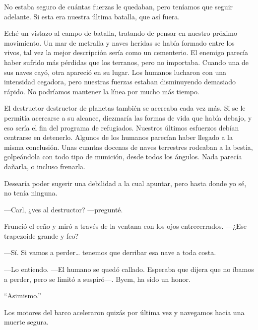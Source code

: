 No estaba seguro de cuántas fuerzas le quedaban, pero teníamos que seguir adelante. Si esta era nuestra última batalla, que así fuera.

Eché un vistazo al campo de batalla, tratando de pensar en nuestro próximo movimiento. Un mar de metralla y naves heridas se había formado entre los vivos, tal vez la mejor descripción sería como un cementerio. El enemigo parecía haber sufrido más pérdidas que los terranos, pero no importaba. Cuando una de sus naves cayó, otra apareció en su lugar. Los humanos lucharon con una intensidad cegadora, pero nuestras fuerzas estaban disminuyendo demasiado rápido. No podríamos mantener la línea por mucho más tiempo.

El destructor destructor de planetas también se acercaba cada vez más. Si se le permitía acercarse a su alcance, diezmaría las formas de vida que había debajo, y eso sería el fin del programa de refugiados. Nuestros últimos esfuerzos debían centrarse en detenerlo. Algunos de los humanos parecían haber llegado a la misma conclusión. Unas cuantas docenas de naves terrestres rodeaban a la bestia, golpeándola con todo tipo de munición, desde todos los ángulos. Nada parecía dañarla, o incluso frenarla.

Desearía poder sugerir una debilidad a la cual apuntar, pero hasta donde yo sé, no tenía ninguna.

—Carl, ¿ves al destructor? —pregunté.

Frunció el ceño y miró a través de la ventana con los ojos entrecerrados. —¿Ese trapezoide grande y feo?

—Sí. Si vamos a perder… tenemos que derribar esa nave a toda costa.

—Lo entiendo. —El humano se quedó callado. Esperaba que dijera que no íbamos a perder, pero se limitó a suspiró—. Byem, ha sido un honor.

``Asimismo.''

Los motores del barco aceleraron quizás por última vez y navegamos hacia una muerte segura.